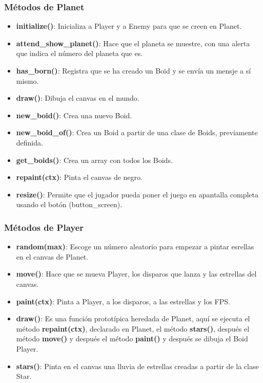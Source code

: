 \documentclass[a4paper,10pt]{article}
\begin{document}
\subsubsection{Métodos de Planet}
\begin{itemize}
 \item \textbf{initialize()}: Inicializa a Player y a Enemy para que se creen en Planet.
 \item \textbf{attend\_show\_planet()}: Hace que el planeta se muestre, con una alerta que indica el número del planeta que es.
 \item \textbf{has\_born()}: Registra que se ha creado un Boid y se envía un mensje a sí mismo.
 \item \textbf{draw()}: Dibuja el canvas en el mundo.
 \item \textbf{new\_boid()}: Crea una nuevo Boid.
 \item \textbf{new\_boid\_of()}: Crea un Boid a partir de una clase de Boids, previamente definida.
 \item \textbf{get\_boids()}: Crea un array con todos los Boids.
 \item \textbf{repaint(ctx)}: Pinta el canvas de negro.
 \item \textbf{resize()}: Permite que el jugador pueda poner el juego en apantalla completa usando el botón (button\_screen).
\end{itemize}


\subsubsection{Métodos de Player}
\begin{itemize}
 \item \textbf{random(max)}: Escoge un número aleatorio para empezar a pintar esrellas en el canvas de Planet.
 \item \textbf{move()}: Hace que se mueva Player, los disparos que lanza y las estrellas del canvas.
 \item \textbf{paint(ctx)}: Pinta a Player, a los disparos, a las estrellas y los FPS.
 \item \textbf{draw()}: Es una función prototípica heredada de Planet, aquí se ejecuta
 el método \textbf{repaint(ctx)}, declarado en Planet, el método \textbf{stars()}, después el método \textbf{move()} y después el método \textbf{paint()} 
 y después se dibuja el Boid Player.
 \item \textbf{stars()}: Pinta en el canvas una lluvia de estrellas creadas a partir de la clase Star.
\end{itemize}
\end{document}
